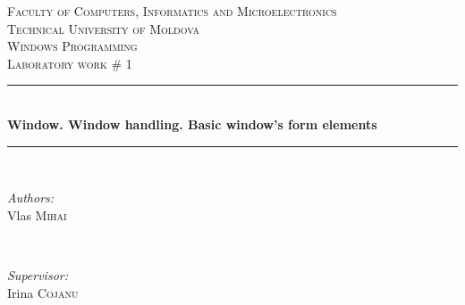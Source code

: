 \documentclass[12pt]{article}
\begin{document}
  \begin{titlepage}

 \newcommand{\HRule}{\rule{\linewidth}{0.5mm}} %
  \begin{center} %

  \textsc{\large Faculty of Computers, Informatics and Microelectronics}\\[0.5cm]
  \textsc{\large Technical University of Moldova}\\[1.2cm] %
  \vspace{35 mm}
  \textsc{\Large Windows Programming}\\[0.5cm] %
  \textsc{\large Laboratory work \# 1}\\[0.5cm] %

  \vspace{10 mm}
  \HRule \\[0.4cm]
  { \LARGE \bfseries Window. Window handling. Basic window’s form elements }\\[0.4cm] %
  \HRule \\[1.5cm]

      \vspace{30mm}

      \begin{minipage}{0.4\textwidth}
      \begin{flushleft} \large
      \emph{Authors:}\\
      Vlas \textsc{Mihai}
      \end{flushleft}
      \end{minipage}
      ~
      \begin{minipage}{0.4\textwidth}
      \begin{flushright} \large
      \emph{Supervisor:} \\
      Irina \textsc{Cojanu} %
      \end{flushright}
      \end{minipage}\\[4cm]


\end{center}
\end{titlepage}
\end{document}
